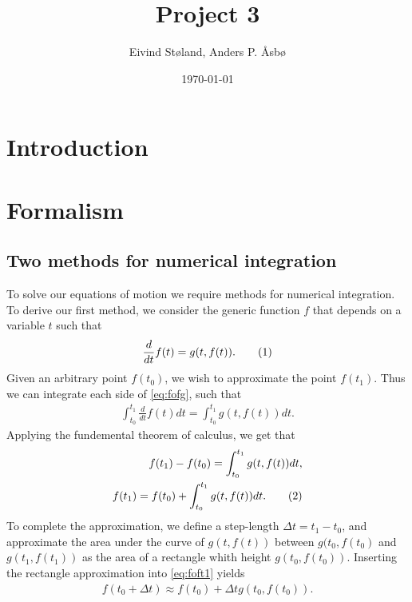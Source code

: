 \documentclass[reprint,english,notitlepage]{revtex4-1}  %
\newcommand\numberthis{\addtocounter{equation}{1}\tag{\theequation}}
\begin{document}
\title{Project 3}   %
\author{Eivind Støland, Anders P. Åsbø}               %
\date{\today}                             %
\noaffiliation                            %

\maketitle                                %


\tableofcontents

\section{Introduction} \label{sec:I}

\section{Formalism} \label{sec:II}

\subsection{Two methods for numerical integration}
To solve our equations of motion we require methods for numerical integration. To derive our first method, we consider the generic function \(f\) that depends on a variable \(t\) such that
\begin{align*}
	\frac{d}{dt}f(t) = g(t, f(t)). \numberthis \label{eq:fofg}
\end{align*}
Given an arbitrary point \(f(t_{0})\), we wish to approximate the point \(f(t_{1})\). Thus we can integrate each side of \eqref{eq:fofg}, such that
\begin{align*}
	\int_{t_{0}}^{t_{1}} \frac{d}{dt} f(t) dt = \int_{t_{0}}^{t_{1}} g(t, f(t)) dt.
\end{align*}
Applying the fundemental theorem of calculus, we get that
\begin{align*}
	f(t_{1}) - f(t_{0}) = \int_{t_{0}}^{t_{1}} g(t, f(t)) dt, \\
	f(t_{1}) = f(t_{0}) + \int_{t_{0}}^{t_{1}} g(t, f(t)) dt. \numberthis \label{eq:foft1}
\end{align*}
To complete the approximation, we define a step-length \(\Delta t = t_{1}-t_{0}\), and approximate the area under the curve of \(g(t, f(t))\) between \(g(t_{0}, f(t_{0})\) and \(g(t_{1}, f(t_{1}))\) as the area of a rectangle whith height \(g(t_{0}, f(t_{0}))\). Inserting the rectangle approximation into \eqref{eq:foft1} yields
\begin{align*}
	f(t_{0} + \Delta t) \approx f(t_{0}) + \Delta t g(t_{0}, f(t_{0})).
\end{align*}
\end{document}
